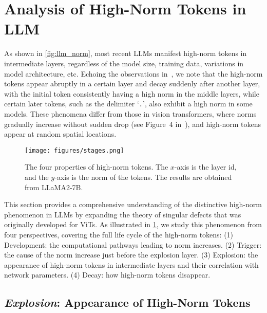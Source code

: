 
\section{Analysis of High-Norm Tokens in LLM}\label{sec:method}

As shown in \cref{fig:llm_norm}, most recent LLMs
manifest high-norm tokens in intermediate layers, regardless of the model size, training data, variations in model architecture, etc.
Echoing the observations in~\cite{sun2024massive}, we note that the high-norm tokens appear abruptly in a certain layer and decay suddenly after another layer, with the initial token consistently having a high norm in the middle layers, while certain later tokens, such as the delimiter `\texttt{.}', also exhibit a high norm in some models.
These phenomena differ from those in vision transformers, where norms gradually increase without sudden drop (see Figure~4 in~\cite{darcetvision}), and high-norm tokens appear at random spatial locations.

\begin{figure}[t]
    \centering
    \texttt{[image: figures/stages.png]}
    \vspace{-0.5em}
    \caption{The four properties of high-norm tokens. The
        \(x\)-axis is the layer id, and the \(y\)-axis is the norm of the tokens.
        The results are obtained from LLaMA2-7B.
    }\label{fig:stages}
    \vspace{-0.5em}
\end{figure}

This section provides a comprehensive understanding of the distinctive high-norm phenomenon in LLMs by expanding the theory of singular defects that was originally developed for ViTs.
As illustrated in \cref{fig:stages}, we study this phenomenon from four perspectives, covering the full life cycle of the high-norm tokens:
(1) Development: the computational pathways leading to norm increases.
(2) Trigger: the cause of the norm increase just before the explosion layer.
(3) Explosion: the appearance of high-norm tokens in intermediate layers and their correlation with network parameters.
(4) Decay: how high-norm tokens disappear.

\subsection{\emph{Explosion}: Appearance of High-Norm Tokens}\label{sec:singular-defects}

